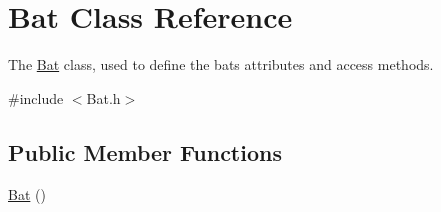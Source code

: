 \hypertarget{class_bat}{}\section{Bat Class Reference}
\label{class_bat}


The \hyperlink{class_bat}{Bat} class, used to define the bat\textquotesingle{}s attributes and access methods.  




{\ttfamily \#include $<$Bat.\+h$>$}

\subsection*{Public Member Functions}
\begin{DoxyCompactItemize}
\item 
\hypertarget{class_bat_ac231b3a270f82b72dace8be983a6ee6c}{}\hyperlink{class_bat_ac231b3a270f82b72dace8be983a6ee6c}{Bat} ()\label{class_bat_ac231b3a270f82b72dace8be983a6ee6c}


\end{DoxyCompactItemize}
